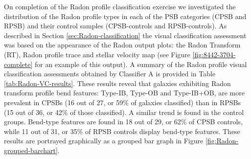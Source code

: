 On completion of the Radon profile classification exercise we investigated the distribution of the Radon profile types in each of the PSB categories (CPSB and RPSB) and their control samples (CPSB-controls and RPSB-controls). As described in Section \ref{sec:Radon-classification} the visual classification assessment was based on the appearance of the Radon output plots: the Radon Transform (RT), Radon profile trace and stellar velocity map (see Figure \ref{fig:8442-3704-complete} for an example of this output). A summary of the Radon profile visual classification assessments obtained by Classifier A is provided in Table \ref{tab:Radon-VC-results}. These results reveal that galaxies exhibiting Radon transform profile bend features: Type-IB, Type-OB and Type-IB+OB, are more prevalent in CPSBs (16 out of 27, or 59\% of galaxies classified) than in RPSBs (15 out of 36, or 42\% of those classified). A similar trend is found in the control groups. Bend-type features are found in 18 out of 29, or 62\% of CPSB controls, while 11 out of 31, or 35\% of RPSB controls display bend-type features. These results are portrayed graphically as a grouped bar graph in Figure \ref{fig:Radon-grouped-barchart}.

